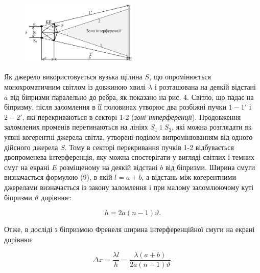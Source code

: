 \documentclass[12pt,a4paper]{article}
\begin{document}
    \begin{figure}[!ht]

        \renewcommand{\thefigure}{\arabic{figure}} %

        \centering
        \includegraphics[width=0.5\textwidth]{4.png}
        \caption{}
        \label{fig4:schema}

    \end{figure}

    Як джерело використовується вузька щілина $S$, 
    що опромінюється монохроматичним світлом із довжиною хвилі $\lambda$ і
    розташована на деякій відстані $a$ від біпризми паралельно до ребра, як показано на рис. 4.
    Світло, що падає на біпризму, після заломлення в її половинах утворює два розбіжні пучки $1-1'$ і $2-2'$, які перекриваються в секторі 1-2 (\textit{зоні інтерференції}).
    Продовження заломлених променів перетинаються на лініях $S_1$ i $S_2$, які можна розглядати як уявні когерентні джерела світла, утворені поділом випромінюванням від одного дійсного джерела $S$.
    Тому в секторі перекривання пучків 1-2 відбувається двопроменева інтерференція, яку можна спостерігати у вигляді світлих і темних смуг на екрані $E$ розміщеному на деякій відстані $b$ від
    біпризми. Ширина смуги визначається формулою (9), в якій $l = a + b$, а відстань між когерентними джерелами визначається із закону заломлення і при
    малому заломлюючому куті біпризми $\vartheta$ дорівнює:

    \begin{equation}
        h = 2a(n-1)\vartheta.
        \tag{10}
    \end{equation}

    Отже, в досліді з біпризмою Френеля ширина інтерференційної смуги на екрані дорівнює

    \begin{equation}
        \Delta x = \frac{\lambda l}{h} = \frac{\lambda (a + b)}{2a(n-1)\vartheta}.
        \tag{11}
    \end{equation}
\end{document}
